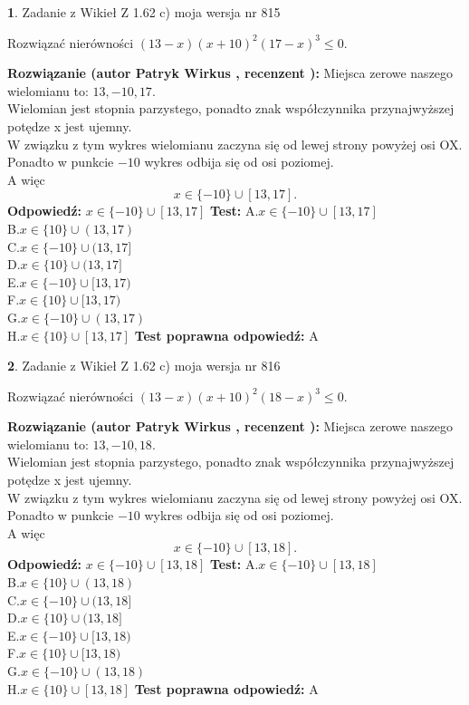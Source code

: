 \documentclass[12pt, a4paper]{article}
\theoremstyle{definition} %
\newtheorem{zad}{}
\newcommand{\zadStart}[1]{\begin{zad}#1\newline}
\newcommand{\zadStop}{\end{zad}}
\newcommand{\rozwStart}[2]{\noindent \textbf{Rozwiązanie (autor #1 , recenzent #2): }\newline}
\newcommand{\rozwStop}{\newline}
\newcommand{\odpStart}{\noindent \textbf{Odpowiedź:}\newline}
\newcommand{\odpStop}{\newline}
\newcommand{\testStart}{\noindent \textbf{Test:}\newline}
\newcommand{\testStop}{\newline}
\newcommand{\kluczStart}{\noindent \textbf{Test poprawna odpowiedź:}\newline}
\newcommand{\kluczStop}{\newline}
\begin{document}
\zadStart{Zadanie z Wikieł Z 1.62 c) moja wersja nr 815}

Rozwiązać nierówności $(13-x)(x+10)^{2}(17-x)^{3}\le0$.
\zadStop
\rozwStart{Patryk Wirkus}{}
Miejsca zerowe naszego wielomianu to: $13, -10, 17$.\\
Wielomian jest stopnia parzystego, ponadto znak współczynnika przy\linebreak najwyższej potędze x jest ujemny.\\ W związku z tym wykres wielomianu zaczyna się od lewej strony powyżej osi OX.\\
Ponadto w punkcie $-10$ wykres odbija się od osi poziomej.\\
A więc $$x \in \{-10\} \cup [13,17].$$
\rozwStop
\odpStart
$x \in \{-10\} \cup [13,17]$
\odpStop
\testStart
A.$x \in \{-10\} \cup [13,17]$\\
B.$x \in \{10\} \cup (13,17)$\\
C.$x \in \{-10\} \cup (13,17]$\\
D.$x \in \{10\} \cup (13,17]$\\
E.$x \in \{-10\} \cup [13,17)$\\
F.$x \in \{10\} \cup [13,17)$\\
G.$x \in \{-10\} \cup (13,17)$\\
H.$x \in \{10\} \cup [13,17]$
\testStop
\kluczStart
A
\kluczStop



\zadStart{Zadanie z Wikieł Z 1.62 c) moja wersja nr 816}

Rozwiązać nierówności $(13-x)(x+10)^{2}(18-x)^{3}\le0$.
\zadStop
\rozwStart{Patryk Wirkus}{}
Miejsca zerowe naszego wielomianu to: $13, -10, 18$.\\
Wielomian jest stopnia parzystego, ponadto znak współczynnika przy\linebreak najwyższej potędze x jest ujemny.\\ W związku z tym wykres wielomianu zaczyna się od lewej strony powyżej osi OX.\\
Ponadto w punkcie $-10$ wykres odbija się od osi poziomej.\\
A więc $$x \in \{-10\} \cup [13,18].$$
\rozwStop
\odpStart
$x \in \{-10\} \cup [13,18]$
\odpStop
\testStart
A.$x \in \{-10\} \cup [13,18]$\\
B.$x \in \{10\} \cup (13,18)$\\
C.$x \in \{-10\} \cup (13,18]$\\
D.$x \in \{10\} \cup (13,18]$\\
E.$x \in \{-10\} \cup [13,18)$\\
F.$x \in \{10\} \cup [13,18)$\\
G.$x \in \{-10\} \cup (13,18)$\\
H.$x \in \{10\} \cup [13,18]$
\testStop
\kluczStart
A
\kluczStop
\end{document}
